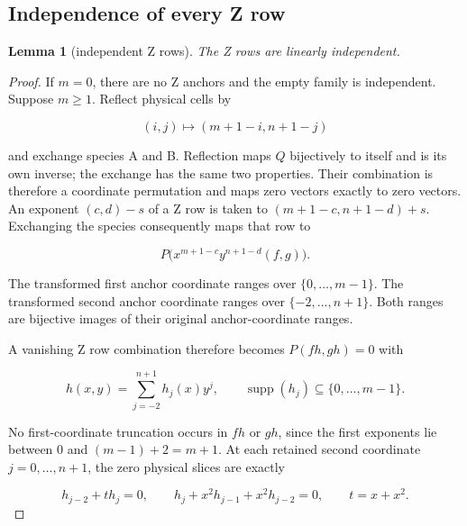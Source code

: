 \documentclass{article}
\newtheorem{lemma}{Lemma}
\begin{document}
\subsection{Independence of every Z
row}\label{independence-of-every-z-row}

\begin{lemma}[independent Z rows]\label{lem:z-independent}
The Z rows are linearly independent.
\end{lemma}

\begin{proof}
If \(m=0\), there are no Z anchors and the empty family
is independent. Suppose \(m\ge 1\). Reflect physical cells by

\begin{equation}
 (i,j)\longmapsto(m+1-i,n+1-j)
\end{equation}

and exchange species A and B. Reflection maps \(Q\) bijectively to
itself and is its own inverse; the exchange has the same two properties.
Their combination is therefore a coordinate permutation and maps zero
vectors exactly to zero vectors. An exponent \((c,d)-s\) of a Z row is
taken to \((m+1-c,n+1-d)+s\). Exchanging the species consequently maps
that row to

\begin{equation}
 P\bigl(x^{m+1-c}y^{n+1-d}(f,g)\bigr).
\end{equation}

The transformed first anchor coordinate ranges over
\(\{0,\ldots ,m-1\}\). The transformed second anchor coordinate ranges
over \(\{-2,\ldots ,n+1\}\). Both ranges are bijective images of their
original anchor-coordinate ranges.

A vanishing Z row combination therefore becomes \(P(fh,gh)=0\) with

\begin{equation}
 h(x,y)=\sum_{j=-2}^{n+1}h_j(x)y^j,
 \qquad \operatorname{supp}(h_j)\subseteq\{0,\ldots,m-1\}.
\end{equation}

No first-coordinate truncation occurs in \(fh\) or \(gh\), since the
first exponents lie between \(0\) and \((m-1)+2=m+1\). At each retained
second coordinate \(j=0,\ldots ,n+1\), the zero physical slices are
exactly

\begin{equation}
 h_{j-2}+t h_j=0,
 \qquad h_j+x^2h_{j-1}+x^2h_{j-2}=0,
 \qquad t=x+x^2.\label{eq:rank-z}
\end{equation}


\end{proof}
\end{document}
